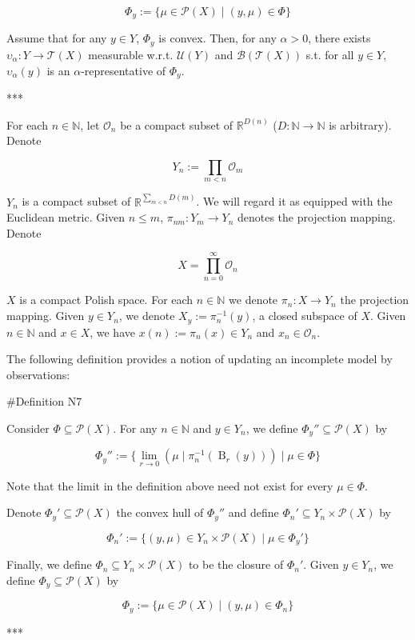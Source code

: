 \documentclass[a4paper]{article}
\newcommand{\Nats}{\mathbb{N}}
\newcommand{\Reals}{\mathbb{R}}
\newcommand{\Prob}{\mathcal{P}}
\newcommand{\Ob}{\mathcal{O}}
\newcommand{\T}{\mathcal{T}}
\newcommand{\B}{\mathcal{B}}
\newcommand{\UM}{\mathcal{U}}
\newcommand{\Ball}{\operatorname{B}}
\begin{document}
$${\Phi_y := \{\mu \in \Prob(X) \mid (y,\mu) \in \Phi\}}$$ 

Assume that for any ${y \in Y}$, ${\Phi_y}$ is convex. Then, for any $\alpha > 0$, there exists ${\upsilon_\alpha: Y \rightarrow \T(X)}$ measurable w.r.t. ${\UM(Y)}$ and ${\B(\T(X))}$ s.t. for all ${y \in Y}$, ${\upsilon_\alpha(y)}$ is an $\alpha$-representative of ${\Phi_y}$.

***

For each ${n \in \Nats}$, let ${\Ob_n}$ be a compact subset of $\Reals^{D(n)}$ ($D: \Nats \rightarrow \Nats$ is arbitrary). Denote 

$${Y_n:=\prod_{m < n} \Ob_m}$$

${Y_n}$ is a compact subset of ${\Reals^{\sum_{m < n} D(m)}}$. We will regard it as equipped with the Euclidean metric. Given ${n \leq m}$, ${\pi_{nm}: Y_m \rightarrow Y_n}$ denotes the projection mapping. Denote 

$${X = \prod_{n = 0}^\infty \Ob_n}$$

${X}$ is a compact Polish space. For each ${n \in \Nats}$ we denote ${\pi_{n}: X \rightarrow Y_n}$ the projection mapping. Given ${y \in Y_n}$, we denote ${X_y:=\pi_{n}^{-1}(y)}$, a closed subspace of ${X}$. Given $n \in \Nats$ and $x \in X$, we have $x(n):=\pi_{n}(x) \in Y_n$ and $x_n \in \Ob_n$.

The following definition provides a notion of updating an incomplete model by observations:

\#Definition N7

Consider ${\Phi \subseteq \Prob(X)}$. For any ${n \in \Nats}$ and ${y \in Y_n}$, we define ${\Phi_y'' \subseteq \Prob(X)}$ by

$$\Phi_y'':=\{\lim_{r \rightarrow 0} (\mu \mid \pi_{n}^{-1}(\Ball_r(y))) \mid \mu \in \Phi\}$$

Note that the limit in the definition above need not exist for every ${\mu \in \Phi}$.

Denote ${\Phi_y' \subseteq \Prob(X)}$ the convex hull of ${\Phi_y''}$ and define ${\Phi_n' \subseteq Y_n \times \Prob(X)}$ by

$$\Phi_n':=\{(y,\mu) \in Y_n \times \Prob(X) \mid \mu \in \Phi_y'\}$$

Finally, we define ${\Phi_n \subseteq Y_n \times \Prob(X)}$ to be the closure of ${\Phi_n'}$. Given ${y \in Y_n}$, we define ${\Phi_y \subseteq \Prob(X)}$ by

$$\Phi_y:=\{\mu \in \Prob(X) \mid (y,\mu) \in \Phi_n\}$$

***
\end{document}
